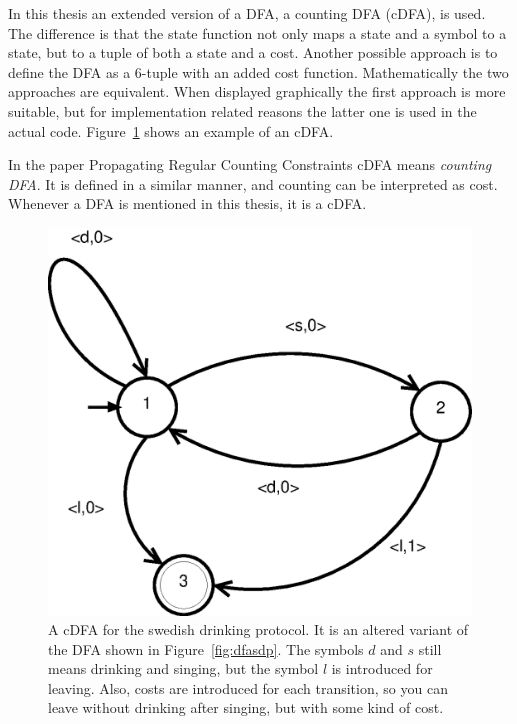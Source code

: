 \documentclass[a4paper,11pt]{article}
\begin{document}
In this thesis an extended version of a DFA, a counting DFA (cDFA), is used. The difference is that the state function not only maps a state and a symbol to a state, but to a tuple of both a state and a cost. Another possible approach is to define the DFA as a 6-tuple with an added cost function. Mathematically the two approaches are equivalent. When displayed graphically the first approach is more suitable, but for implementation related reasons the latter one is used in the actual code. Figure~\ref{fig:cdfasdp} shows an example of an cDFA.

In the paper Propagating Regular Counting Constraints cDFA means \textit{counting DFA}. It is defined in a similar manner, and counting can be interpreted as cost. Whenever a DFA is mentioned in this thesis, it is a cDFA.

\begin{figure}[H]
\centering
\includegraphics[scale=0.6]{cdfa.eps}
\caption{A cDFA for the swedish drinking protocol. It is an altered variant of the DFA shown in Figure~\ref{fig:dfasdp}. The symbols $d$ and $s$ still means drinking and singing, but the symbol $l$ is introduced for leaving. Also, costs are introduced for each transition, so you can leave without drinking after singing, but with some kind of cost.}
\label{fig:cdfasdp}
\end{figure}
\end{document}

